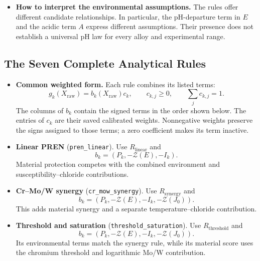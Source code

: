 \documentclass[11pt]{article}
\newenvironment{notes}
  {\begin{itemize}\setlength{\itemsep}{0.45em}\setlength{\parsep}{0pt}}
  {\end{itemize}}
\begin{document}
\begin{notes}
    \item \textbf{How to interpret the environmental assumptions.}
    The rules offer different candidate relationships.
    In particular, the pH-departure term in \(E\) and the
    acidic term \(A\) express different assumptions.
    Their presence does not establish a universal pH law
    for every alloy and experimental range.
\end{notes}

\subsection{The Seven Complete Analytical Rules}
\label{sec:analytical-rule-families}

\begin{notes}
    \item \textbf{Common weighted form.}
    Each rule combines its listed terms:
    \begin{equation}
        g_k(X_{\mathrm{raw}})
        =b_k(X_{\mathrm{raw}})c_k,
        \qquad
        c_{k,j}\geq0,\qquad
        \sum_j c_{k,j}=1.
        \label{eq:analytical-rule-vector}
    \end{equation}
    The columns of \(b_k\) contain the signed terms in the
    order shown below. The entries of \(c_k\) are their
    saved calibrated weights. Nonnegative weights preserve
    the signs assigned to those terms; a zero coefficient
    makes its term inactive.

    \item \textbf{Linear PREN}
    (\texttt{pren\_linear}).
    Use \(R_{\mathrm{linear}}\) and
    \[
        b_k=(P_k,-\mathcal{Z}(E),-I_k).
    \]
    Material protection competes with the combined environment
    and susceptibility--chloride contributions.

    \item \textbf{Cr--Mo/W synergy}
    (\texttt{cr\_mow\_synergy}).
    Use \(R_{\mathrm{synergy}}\) and
    \[
        b_k=(P_k,-\mathcal{Z}(E),-I_k,-\mathcal{Z}(J_0)).
    \]
    This adds material synergy and a separate
    temperature--chloride contribution.

    \item \textbf{Threshold and saturation}
    (\texttt{threshold\_saturation}).
    Use \(R_{\mathrm{threshold}}\) and
    \[
        b_k=(P_k,-\mathcal{Z}(E),-I_k,-\mathcal{Z}(J_0)).
    \]
    Its environmental terms match the synergy rule, while
    its material score uses the chromium threshold and
    logarithmic Mo/W contribution.


\end{notes}
\end{document}

